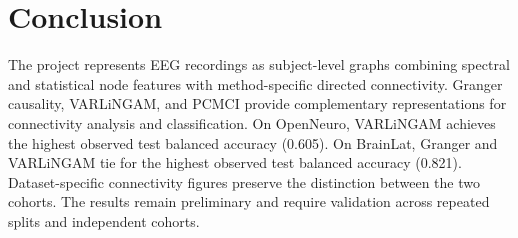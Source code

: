 \documentclass[11pt,a4paper]{article}
\begin{document}
\section{Conclusion}

The project represents EEG recordings as subject-level graphs combining
spectral and statistical node features with method-specific directed
connectivity. Granger causality, VARLiNGAM, and PCMCI provide complementary
representations for connectivity analysis and classification.
On OpenNeuro, VARLiNGAM achieves the highest observed test balanced accuracy (0.605).
On BrainLat, Granger and VARLiNGAM tie for the highest observed test balanced accuracy (0.821).
Dataset-specific connectivity figures preserve the distinction
between the two cohorts. The results remain preliminary and require
validation across repeated splits and independent cohorts.
\end{document}
